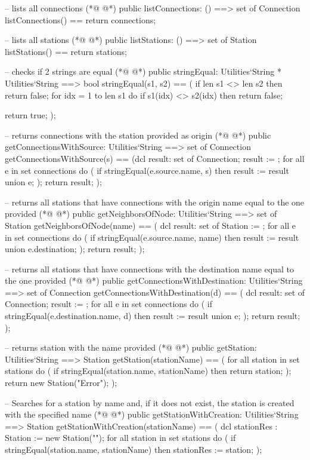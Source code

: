 \begin{vdmpp}[breaklines=true]
 -- lists all connections
(*@
\label{listConnections:66}
@*)
 public listConnections: () ==> set of Connection 
  listConnections() == return connections;
  
 -- lists all stations
(*@
\label{listStations:70}
@*)
 public listStations: () ==> set of Station
  listStations() == return stations;
  
 -- checks if 2 strings are equal
(*@
\label{stringEqual:74}
@*)
 public stringEqual: Utilities`String * Utilities`String ==> bool
 stringEqual(s1, s2) ==
 (
  if len s1 <> len s2 then
   return false;
  for idx = 1 to len s1 do
   if s1(idx) <> s2(idx) then return false;
  
  return true;
 );
 
 -- returns connections with the station provided as origin
(*@
\label{getConnectionsWithSource:86}
@*)
 public getConnectionsWithSource: Utilities`String ==> set of Connection
 getConnectionsWithSource(s) ==
 (dcl result: set of Connection;
  result := {};
  for all e in set connections do
  (
   if stringEqual(e.source.name, s) then result := result union {e}; 
  );
  return result;
 );
 
 -- returns all stations that have connections with the origin name equal to the one provided
(*@
\label{getNeighborsOfNode:98}
@*)
 public getNeighborsOfNode: Utilities`String ==> set of Station
 getNeighborsOfNode(name) ==
 (
  dcl result: set of Station := {};
  for all e in set connections do
  (
   if stringEqual(e.source.name, name) then result := result union {e.destination};
  );
  return result;
 );
 
 -- returns all stations that have connections with the destination name equal to the one provided
(*@
\label{getConnectionsWithDestination:110}
@*)
 public getConnectionsWithDestination: Utilities`String ==> set of Connection
 getConnectionsWithDestination(d) ==
 (
  dcl result: set of Connection;
   result := {};
  for all e in set connections do
  (
   if stringEqual(e.destination.name, d) then result := result union {e}; 
  );
  return result;
 );   
 
 -- returns station with the name provided
(*@
\label{getStation:123}
@*)
 public getStation: Utilities`String ==> Station
 getStation(stationName) ==
 (
  for all station in set stations do (
   if stringEqual(station.name, stationName) then 
     return station;
  ); 
  return new Station("Error");
 );
 
 
 -- Searches for a station by name and, if it does not exist, the station is created with the specified name 
(*@
\label{getStationWithCreation:135}
@*)
 public getStationWithCreation: Utilities`String ==> Station
 getStationWithCreation(stationName) == 
 (
  dcl stationRes : Station := new Station("");
  for all station in set stations do (
   if stringEqual(station.name, stationName) then stationRes := station;
  ); 
  

\end{vdmpp}

